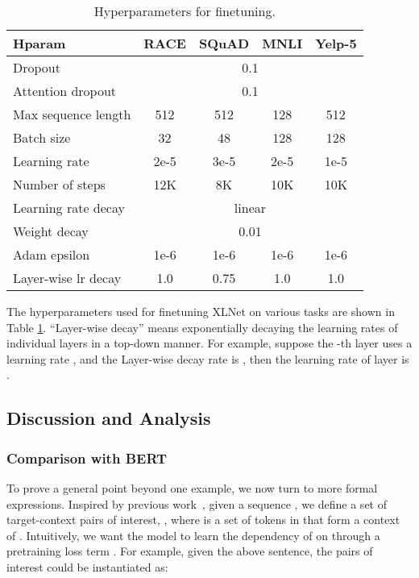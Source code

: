 \documentclass{article}
\begin{document}
\begin{table}[h!]
  \small
  \centering
  
  \begin{tabular}{lcccc}
    \toprule
    \bf Hparam & \bf RACE & \bf SQuAD & \bf MNLI & \bf Yelp-5 \\
    \midrule
    Dropout             & \multicolumn{4}{c}{0.1}    \\
    Attention dropout   & \multicolumn{4}{c}{0.1}    \\
    Max sequence length & 512  & 512  & 128  & 512   \\
    Batch size          & 32   & 48   & 128  & 128   \\
    Learning rate       & 2e-5 & 3e-5 & 2e-5 & 1e-5  \\
    Number of steps     & 12K  & 8K   & 10K  & 10K   \\
    Learning rate decay & \multicolumn{4}{c}{linear} \\
    Weight decay        & \multicolumn{4}{c}{0.01}   \\
    Adam epsilon        & 1e-6 & 1e-6 & 1e-6 & 1e-6  \\
    Layer-wise lr decay & 1.0  & 0.75 & 1.0  & 1.0   \\
    \bottomrule
  \end{tabular}
  \caption{\small
    Hyperparameters for finetuning.
  }
  \label{tab:hp-finetune}
  \vspace{-1em}
\end{table}

The hyperparameters used for finetuning XLNet on various tasks are shown in Table \ref{tab:hp-finetune}. ``Layer-wise decay'' means exponentially decaying the learning rates of individual layers in a top-down manner. For example, suppose the -th layer uses a learning rate , and the Layer-wise decay rate is , then the learning rate of layer  is .


\subsection{Discussion and Analysis}
\label{sec:discussion}
\subsubsection{Comparison with BERT}
\label{sec:compare-bert}





To prove a general point beyond one example, we now turn to more formal expressions. Inspired by previous work~\cite{yang2017breaking}, given a sequence , we define a set of target-context pairs of interest, , where  is a set of tokens in  that form a context of . Intuitively, we want the model to learn the dependency of  on  through a pretraining loss term .
For example, given the above sentence, the pairs of interest  could be instantiated as:
\end{document}
